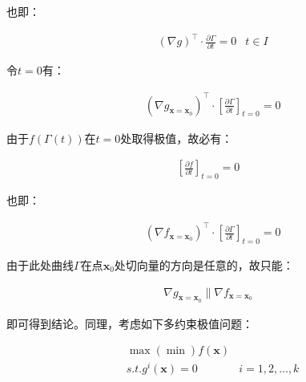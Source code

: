 \documentclass[UTF8]{book}
\begin{document}
也即：
\begin{large}
    \begin{equation}
        \begin{aligned}
            &\left ( \nabla g\right )^\top \cdot \frac{\partial \Gamma}{\partial t}=0& t \in I
            \nonumber
        \end{aligned}
    \end{equation}
\end{large}
令$t=0$有：
\begin{large}
    \begin{equation}
        \begin{aligned}
            &\left ( \nabla g_{\mathbf{x}=\mathbf{x}_0}\right )^\top \cdot \left [ \frac{\partial \Gamma}{\partial t} \right ]_{t=0}=0
            \nonumber
        \end{aligned}
    \end{equation}
\end{large}
由于$f\left ( \Gamma(t) \right )$在$t=0$处取得极值，故必有：
\begin{large}
    \begin{equation}
        \begin{aligned}
            \left [\frac{\partial f}{\partial t}\right ]_{t=0}=0
            \nonumber
        \end{aligned}
    \end{equation}
\end{large}
也即：
\begin{large}
    \begin{equation}
        \begin{aligned}
            &\left ( \nabla f_{\mathbf{x}=\mathbf{x}_0}\right )^\top \cdot \left [ \frac{\partial \Gamma}{\partial t} \right ]_{t=0}=0
            \nonumber
        \end{aligned}
    \end{equation}
\end{large}
由于此处曲线$\Gamma$在点$\mathbf{x}_0$处切向量的方向是任意的，故只能：
\begin{large}
    \begin{equation}
        \begin{aligned}
            \nabla g_{\mathbf{x}=\mathbf{x}_0} \parallel \nabla f_{\mathbf{x}=\mathbf{x}_0}
            \nonumber
        \end{aligned}
    \end{equation}
\end{large}
即可得到结论。同理，考虑如下多约束极值问题：
\begin{large}
    \begin{equation}
        \begin{aligned}
            &\max(\min) f(\mathbf{x})& \\
            &s.t. g^i(\mathbf{x})=0& i=1,2,\dots,k
            \nonumber
        \end{aligned}
    \end{equation}
\end{large}
\end{document}
